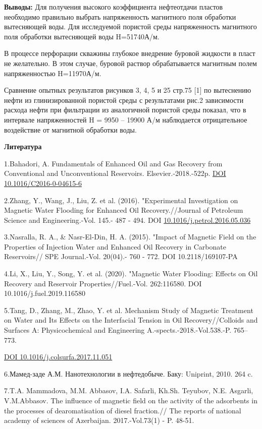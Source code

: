 {{{\bfseries Выводы:} Для получения высокого коэффициента нефтеотдачи пластов
необходимо правильно выбрать напряженность магнитного поля обработки
вытесняющей воды. Для исследуемой пористой среды напряженность
магнитного поля обработки вытесняющей воды H=51740А/м.

В процессе перфорации скважины глубокое внедрение буровой жидкости в
пласт не желательно. В этом случае, буровой раствор обрабатывается
магнитным полем напряженностью H=11970А/м.

Сравнение опытных результатов рисунков 3, 4, 5 и 25 стр.75 {[}1{]} по
вытеснению нефти из глинизированной пористой среды с результатами рис.2
зависимости расхода нефти при фильтрации из аналогичной пористой среды
показал, что в интервале напряженностей H = 9950 -- 19900 А/м
наблюдается отрицательное воздействие от магнитной обработки воды.

{\bfseries Литература}

1.Bahadori, A. Fundamentals of Enhanced Oil and Gas Recovery from
Conventional and Unconventional Reservoirs. Elsevier.-2018.-522p.
\href{https://doi.org/10.1016/C2016-0-04615-6}{DOI
10.1016/C2016-0-04615-6}

2.Zhang, Y., Wang, J., Liu, Z. et al. (2016). "Experimental
Investigation on Magnetic Water Flooding for Enhanced Oil
Recovery.//Journal of Petroleum Science and Engineering.-Vol. 145.- 487
- 494. DOI
\href{https://doi.org/10.1016/j.petrol.2016.05.036}{10.1016/j.petrol.2016.05.036}

3.Nasralla, R. A., \& Nasr-El-Din, H. A. (2015). "Impact of Magnetic
Field on the Properties of Injection Water and Enhanced Oil Recovery in
Carbonate Reservoirs// SPE Journal.-Vol. 20(04).- 760 - 772. DOI
10.2118/169107-PA

4.Li, X., Liu, Y., Song, Y. et al. (2020). "Magnetic Water Flooding:
Effects on Oil Recovery and Reservoir Properties//Fuel.-Vol. 262:116580.
DOI 10.1016/j.fuel.2019.116580

5.Tang, D., Zhang, M., Zhao, Y. et al. Mechanism Study of Magnetic
Treatment on Water and Its Effects on the Interfacial Tension in Oil
Recovery//Colloids and Surfaces A: Physicochemical and Engineering
A.-spects.-2018.-Vol.538.-P. 765--773.

\href{https://doi.org/10.1016/j.colsurfa.2017.11.051}{DOI
10.1016/j.colsurfa.2017.11.051}

6.Мамед-заде А.М. Нанотехнологии в нефтедобыче. Баку: Uniprint, 2010.
264 c.

7.T.A. Mammadova, M.M. Abbasov, I.A. Safarli, Kh.Sh. Teyubov, N.E.
Asgarli, V.M.Abbasov. The influence of magnetic field on the activity of
the adsorbents in the processes of dearomatisation of diesel fraction.//
The reports of national academy of sciences of Azerbaijan.
2017.-Vol.73(1) - P. 48-51.

}}
